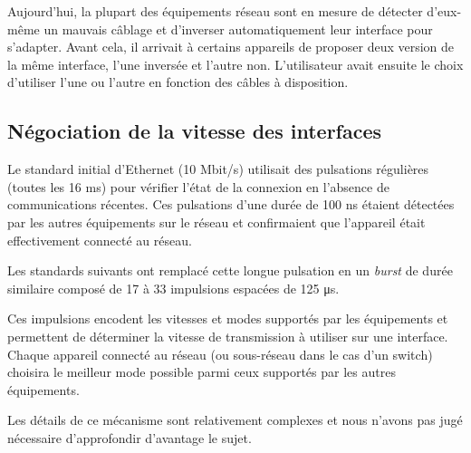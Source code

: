 \documentclass[11pt,a4paper]{article}
\begin{document}
Aujourd'hui, la plupart des équipements réseau sont en mesure de détecter d'eux-même un mauvais câblage et d'inverser automatiquement leur interface pour s'adapter. Avant cela, il arrivait à certains appareils de proposer deux version de la même interface, l'une inversée et l'autre non. L'utilisateur avait ensuite le choix d'utiliser l'une ou l'autre en fonction des câbles à disposition.

\subsection{Négociation de la vitesse des interfaces}

Le standard initial d'Ethernet (10 Mbit/s) utilisait des pulsations régulières (toutes les 16 ms) pour vérifier l'état de la connexion en l'absence de communications récentes. Ces pulsations d'une durée de 100 ns étaient détectées par les autres équipements sur le réseau et confirmaient que l'appareil était effectivement connecté au réseau.

Les standards suivants ont remplacé cette longue pulsation en un \textit{burst} de durée similaire composé de 17 à 33 impulsions espacées de 125 \si{\micro\second}.

Ces impulsions encodent les vitesses et modes supportés par les équipements et permettent de déterminer la vitesse de transmission à utiliser sur une interface. Chaque appareil connecté au réseau (ou sous-réseau dans le cas d'un switch) choisira le meilleur mode possible parmi ceux supportés par les autres équipements.

Les détails de ce mécanisme sont relativement complexes et nous n'avons pas jugé nécessaire d'approfondir d'avantage le sujet.
\end{document}
